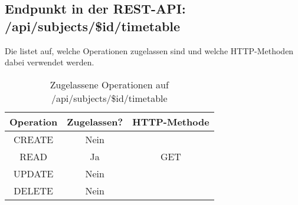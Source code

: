 \subsection{Endpunkt in der REST-API: /api/subjects/\$id/timetable}
Die  listet auf, welche Operationen zugelassen sind und welche HTTP-Methoden dabei verwendet werden. 

\begin{table}[!htbp]
	\begin{tabular}{|c|c|c|}
		\hline
			\textbf{Operation} & \textbf{Zugelassen?} & \textbf{HTTP-Methode} \\ \hline
			CREATE & Nein & \\ \hline 
			READ & Ja & GET \\ \hline
			UPDATE & Nein & \\ \hline 
			DELETE & Nein & \\ \hline
	\end{tabular}

		\caption{Zugelassene Operationen auf /api/subjects/\$id/timetable}
		\label{tab:rest:api:subjects:id:timetable:meth}
\end{table}

